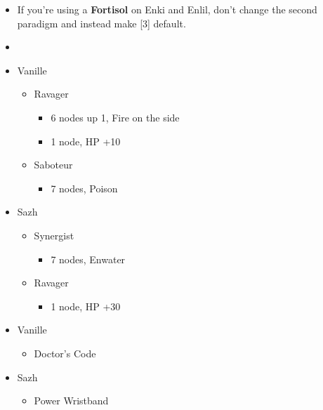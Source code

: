 \begin{menu}
		\begin{itemize}
			\paradigm
			\begin{itemize}
				\item If you're using a \textbf{Fortisol} on Enki and Enlil, don't change the second paradigm and instead make [3] default.
				\item {}%
				      {\paradigmline{\rav}{\com}{}}%
				      {\paradigmline[2]{\textit{(\sab)}}{\textit{(\syn)}}{}}%
				      {\paradigmline{\sab}{\syn}{}}%
				      {\paradigmline{\rav}{\rav}{}}%
				      {\paradigmline{[\sab]}{(\rav)}{}}%
				      {\paradigmline{[\sab]}{\com}{}}
			\end{itemize}
			\crystarium
			\begin{itemize}
				\item Vanille
				      \begin{itemize}
					      \item Ravager
					            \begin{itemize}
						            \item 6 nodes up 1, Fire on the side
						            \item 1 node, HP +10
					            \end{itemize}
					      \item Saboteur
					            \begin{itemize}
						            \item 7 nodes, Poison
					            \end{itemize}
				      \end{itemize}
				\item Sazh
				      \begin{itemize}
					      \item Synergist
					            \begin{itemize}
						            \item 7 nodes, Enwater
					            \end{itemize}
					      \item Ravager
					            \begin{itemize}
						            \item 1 node, HP +30
					            \end{itemize}
				      \end{itemize}
			\end{itemize}
			\equip
			\begin{itemize}
				\item Vanille
				      \begin{itemize}
					      \item Doctor's Code
				      \end{itemize}
				\item Sazh
				      \begin{itemize}
					      \item Power Wristband
				      \end{itemize}
			\end{itemize}
		\end{itemize}
\end{menu}
